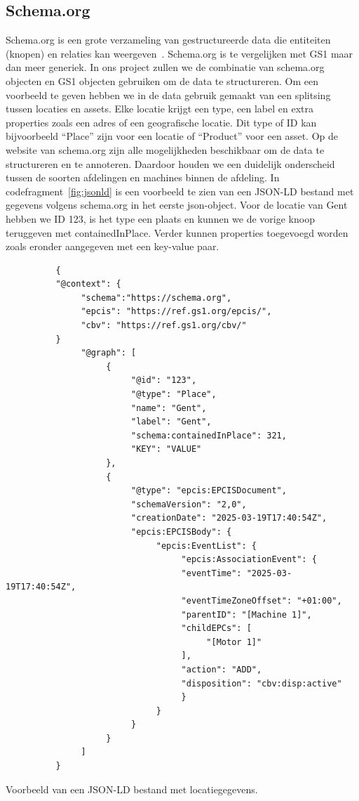 \subsection{Schema.org}
Schema.org is een grote verzameling van gestructureerde data die entiteiten (knopen) en relaties kan weergeven~\autocite{Douglas2023}.
Schema.org is te vergelijken met GS1 maar dan meer generiek. In ons project zullen we de combinatie van schema.org objecten en GS1 objecten gebruiken om de data te structureren.
Om een voorbeeld te geven hebben we in de data gebruik gemaakt van een splitsing tussen locaties en assets.
Elke locatie krijgt een type, een label en extra properties zoals een adres of een geografische locatie.
Dit type of ID kan bijvoorbeeld ``Place'' zijn voor een locatie of ``Product'' voor een asset. 
Op de website van schema.org zijn alle mogelijkheden beschikbaar om de data te structureren en te annoteren.
Daardoor houden we een duidelijk onderscheid tussen de soorten afdelingen en machines binnen de afdeling.
In codefragment~\ref{fig:jsonld} is een voorbeeld te zien van een JSON-LD bestand met gegevens volgens schema.org in het eerste json-object.
Voor de locatie van Gent hebben we ID 123, is het type een plaats en kunnen we de vorige knoop teruggeven met containedInPlace.
Verder kunnen properties toegevoegd worden zoals eronder aangegeven met een key-value paar.
\begin{listing}
     \begin{verbatim}
          {
          "@context": {
               "schema":"https://schema.org",
               "epcis": "https://ref.gs1.org/epcis/",
               "cbv": "https://ref.gs1.org/cbv/"
          }
               "@graph": [
                    {
                         "@id": "123",
                         "@type": "Place",
                         "name": "Gent",
                         "label": "Gent",
                         "schema:containedInPlace": 321,
                         "KEY": "VALUE"
                    },
                    {
                         "@type": "epcis:EPCISDocument",
                         "schemaVersion": "2,0",
                         "creationDate": "2025-03-19T17:40:54Z",
                         "epcis:EPCISBody": {
                              "epcis:EventList": {
                                   "epcis:AssociationEvent": {
                                   "eventTime": "2025-03-19T17:40:54Z",
                                   "eventTimeZoneOffset": "+01:00",
                                   "parentID": "[Machine 1]",
                                   "childEPCs": [
                                        "[Motor 1]"
                                   ],
                                   "action": "ADD",
                                   "disposition": "cbv:disp:active"
                                   }
                              }
                         }
                    }
               ]
          }
     \end{verbatim}
     \caption[Voorbeeld JSON-LD bestand]{\label{fig:jsonld}Voorbeeld van een JSON-LD bestand met locatiegegevens.}
\end{listing}

